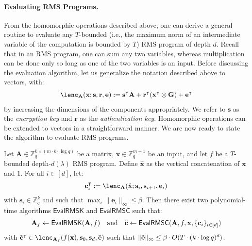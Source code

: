 \documentclass{article}
\newcommand{\Z}{\mathbb{Z}}
\renewcommand{\sec}{\ensuremath{\lambda}}
\newcommand{\algofont}[1]{\ensuremath{\mathsf{#1}}}
\newcommand{\Eval}{\algofont{Eval}\xspace}
\begin{document}
\paragraph{Evaluating RMS Programs.} From the homomorphic operations described above, one can derive a general routine to evaluate any $T$-bounded (i.e., the maximum norm of an intermediate variable of the computation is bounded by $T$) RMS program of depth $d$. Recall that in an RMS program, one can sum any two variables, whereas multiplication can be done only so long as one of the two variables is an input. Before discussing the evaluation algorithm, let us generalize the notation described above to vectors, with:
\[
\lenc_\mathbf{A} (\mathbf{x};\mathbf{s}, \mathbf{r}, \mathbf{e}) := \mathbf{s}^\intercal\mathbf{A}+\mathbf{r}^\intercal (\mathbf{x}^\intercal\otimes\mathbf{G})+\mathbf{e}^\intercal
\]
by increasing the dimensions of the components appropriately. We refer to $\mathbf{s}$ as the \emph{encryption key} and $\mathbf{r}$ as the \emph{authentication key}. Homomorphic operations can be extended to vectors in a straightforward manner. We are now ready to state the algorithm to evaluate RMS programs. 

\begin{lemma}
\label{evalRMS}
Let $\mathbf{A}\in\Z_q^{k\times (m\cdot k\cdot \log q)}$ be a matrix, $\mathbf{x}\in\Z_q^{m-1}$ be an input, and let $f$ be a $T$-bounded depth-$d(\sec)$ RMS program. Define $\hat{\mathbf{x}}$ as the vertical concatenation of $\mathbf{x}$ and $1$.
For all $i\in[d]$, let:
\[
\mathbf{c}_i^\intercal := \lenc_{\mathbf{A}}(\hat{\mathbf{x}}; \mathbf{s}_i, \mathbf{s}_{i+1}, \mathbf{e}_i)
\]
with $\mathbf{s}_i\in \Z_q^k$ and such that $\max_i \|\mathbf{e}_i\|_\infty \leq \beta$. Then there exist two polynomial-time algorithms $\Eval\mathsf{RMSK}$ and $\Eval\mathsf{RMSC}$ such that:
\[
\mathbf{A}_f\gets \Eval\mathsf{RMSK}(\mathbf{A}, f) \quad\text{and}\quad
\Tilde{\mathbf{c}}\gets \Eval\mathsf{RMSC}(\mathbf{A}, f, \mathbf{x}, \{\mathbf{c}_i\}_{i\in [d]})
\]
with $\Tilde{\mathbf{c}}^\intercal \in \lenc_{\mathbf{A}_f}(f(\mathbf{x}), \mathbf{s}_0, \mathbf{s}_d, \Tilde{\mathbf{e}})$ such that $\|\Tilde{\mathbf{e}}\|_\infty \leq \beta \cdot O(T \cdot (k\cdot \log q)^d)$.
\end{lemma}
\end{document}
